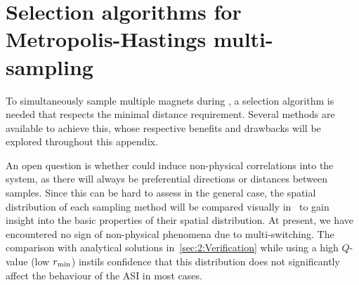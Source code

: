 \chapter{Selection algorithms for Metropolis-Hastings multi-sampling}\label{app:Selection_algorithms}
To simultaneously sample multiple magnets during , a selection algorithm is needed that respects the minimal distance requirement.
Several methods are available to achieve this, whose respective benefits and drawbacks will be explored throughout this appendix. \par
An open question is whether  could induce non-physical correlations into the system, as there will always be preferential directions or distances between samples.
Since this can be hard to assess in the general case, the spatial distribution of each sampling method will be compared visually in~ to gain insight into the basic properties of their spatial distribution.
At present, we have encountered no sign of non-physical phenomena due to multi-switching.
The comparison with analytical solutions in~\cref{sec:2:Verification} while using a high $Q$-value (low $r_\mathrm{min}$) instils confidence that this distribution does not significantly affect the behaviour of the ASI in most cases.

